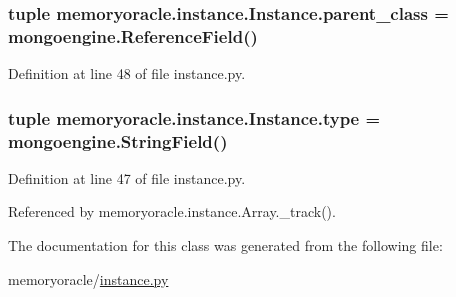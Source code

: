 \hypertarget{classmemoryoracle_1_1instance_1_1Instance_a0e0c0814b7ef0c14542c7ea9e21721eb}{}
\subsubsection[{parent\+\_\+class}]{\setlength{\rightskip}{0pt plus 5cm}tuple memoryoracle.\+instance.\+Instance.\+parent\+\_\+class = mongoengine.\+Reference\+Field(\textquotesingle{})\hspace{0.3cm}{\ttfamily [static]}}\label{classmemoryoracle_1_1instance_1_1Instance_a0e0c0814b7ef0c14542c7ea9e21721eb}


Definition at line 48 of file instance.\+py.

\hypertarget{classmemoryoracle_1_1instance_1_1Instance_a91ca94e82ac4391a0b034d31322caf73}{}
\subsubsection[{type}]{\setlength{\rightskip}{0pt plus 5cm}tuple memoryoracle.\+instance.\+Instance.\+type = mongoengine.\+String\+Field()\hspace{0.3cm}{\ttfamily [static]}}\label{classmemoryoracle_1_1instance_1_1Instance_a91ca94e82ac4391a0b034d31322caf73}


Definition at line 47 of file instance.\+py.



Referenced by memoryoracle.\+instance.\+Array.\+\_\+track().



The documentation for this class was generated from the following file\+:\begin{DoxyCompactItemize}
\item 
memoryoracle/\hyperlink{instance_8py}{instance.\+py}\end{DoxyCompactItemize}
